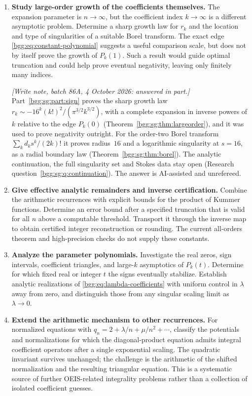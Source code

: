 \documentclass[11pt,a4paper]{article}
\numberwithin{equation}{section}
\theoremstyle{definition}
\theoremstyle{remark}
\theoremstyle{definition}
\begin{document}
\begin{enumerate}[label=\textbf{\arabic*.}]
\item \textbf{Study large-order growth of the coefficients themselves.}
The expansion parameter is $n\to\infty$, but the coefficient index
$k\to\infty$ is a different asymptotic problem. Determine a sharp growth law
for $r_k$ and the location and type of singularities of a suitable Borel
transform. The exact edge \eqref{bgg:eq:constant-polynomial} suggests a useful
comparison scale, but does not by itself prove the growth of $P_k(1)$.
Such a result would guide optimal truncation and could help prove eventual
negativity, leaving only finitely many indices.

\emph{[Write note, batch 86A, 4 October 2026: answered in part.]}
Part~\ref{bgg:sg:part:sign} proves the sharp growth law
$r_k\sim-16^k(k!)^2/(\pi^{3/2}k^{3/2})$, with a complete expansion in
inverse powers of $k$ relative to the edge $P_k(0)$
(Theorem~\ref{bgg:sg:thm:largeorder}), and it was used to prove
negativity outright. For the order-two Borel transform
$\sum_kd_ks^k/(2k)!$ it proves radius~$16$ and a logarithmic singularity
at $s=16$, as a radial boundary law (Theorem~\ref{bgg:sg:thm:borel}).
The analytic continuation, the full singularity set and Stokes data
stay open (Research question~\ref{bgg:sg:q:continuation}). The answer is
AI-assisted and unrefereed.

\item \textbf{Give effective analytic remainders and inverse certification.}
Combine the arithmetic recurrences with explicit bounds for the product of
Kummer functions. Determine an error bound after a specified truncation that
is valid for all $n$ above a computable threshold. Transport it through the
inverse map to obtain certified integer reconstruction or rounding. The
current all-orders theorem and high-precision checks do not supply these
constants.

\item \textbf{Analyze the parameter polynomials.}
Investigate the real zeros, sign intervals, coefficient triangles, and
large-$k$ asymptotics of $P_k(t)$. Determine for which fixed real or integer
$t$ the signs eventually stabilize. Establish analytic realizations of
\eqref{bgg:eq:lambda-coefficients} with uniform control in $\lambda$ away from
zero, and distinguish those from any singular scaling limit as
$\lambda\to0$.

\item \textbf{Extend the arithmetic mechanism to other recurrences.}
For normalized equations with $q_n=2+\lambda/n+\mu/n^2+\cdots$, classify the
potentials and normalizations for which the diagonal-product equation admits
integral coefficient operators after a single exponential scaling. The
quadratic invariant survives unchanged; the challenge is the arithmetic of
the shifted normalization and the resulting triangular equation. This is a
systematic source of further OEIS-related integrality problems rather than a
collection of isolated coefficient guesses.


\end{enumerate}
\end{document}
